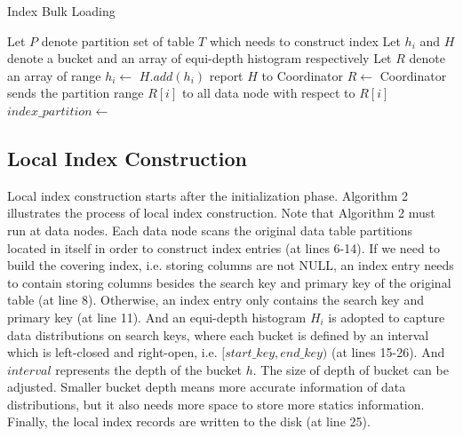 \newcommand{\forcond}{$i=0$ \KwTo $n$}
\LinesNumbered
\newcommand{\fortol}{$i=0$ \KwTo $L$}
\newcommand{\fortok}{$j=1$ \KwTo $k$}
\vspace{-0.5cm}
\begin{algorithm}[htb]
	\SetAlgoLined
	\caption{Index Bulk Loading}%
	Let $P$ denote partition set of table $T$ which needs to construct index\;
	Let $h_i$ and $H$ denote a bucket and an array of equi-depth histogram respectively\;
	Let $R$ denote an array of range
	{
		$h_i\leftarrow$ {} \;
		$H.add(h_i)$\;
	}
	report $H$ to Coordinator\;
	$R \leftarrow$ {} \;
	Coordinator sends the partition range $R[i]$ to all data node  with respect to $R[i]$ \;
	{
		$index\_partition \leftarrow$ \;
	}
	
\end{algorithm}
\vspace{-0.5cm}
 \vspace{-0.2cm}
 \subsection{Local Index Construction}
Local index construction starts after the initialization phase. Algorithm 2 illustrates the process of local index construction. Note that Algorithm 2 must run at data nodes. Each data node scans the original data table partitions located in itself in order to construct index entries (at lines 6-14). If we need to build the covering index, i.e. storing columns are not NULL, an index entry needs to contain storing columns besides the search key and primary key of the original table (at line 8). Otherwise, an index entry only contains the search key and primary key (at line 11). And an equi-depth histogram $H_i$ is adopted to capture data distributions on search keys, where each bucket is defined by an interval which is left-closed and right-open, i.e. $[start\_key, end\_key)$ (at lines 15-26). And $interval$ represents the depth of the bucket $h$. The size of depth of bucket can be adjusted. Smaller bucket depth means more accurate information of data distributions, but it also needs more space to store more statics information. Finally, the local index records are written to the disk (at line 25).


